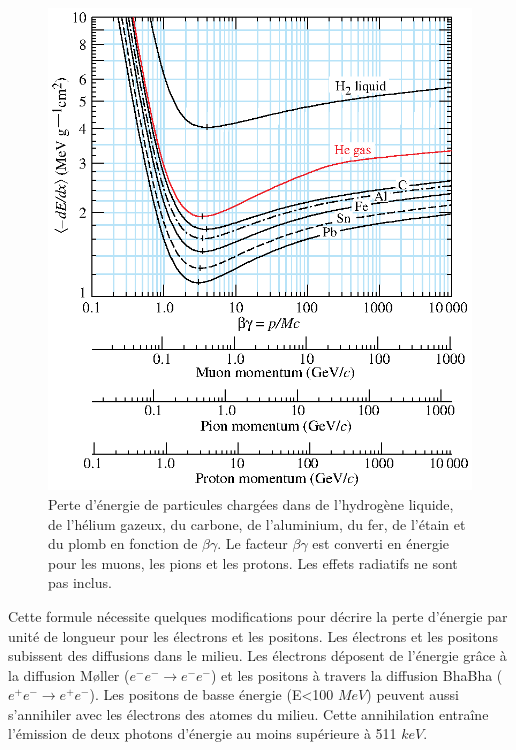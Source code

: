 \begin{figure}[!h]
  \begin{center}
    \includegraphics[width=.6\textwidth]{ShowerTh/figs/dedx_table_98.eps}
    \caption{Perte d'énergie de particules chargées dans de l'hydrogène liquide, de l'hélium gazeux, du carbone, de l'aluminium, du fer, de l'étain et du plomb en fonction de $\beta\gamma$. Le facteur $\beta\gamma$ est converti en énergie pour les muons, les pions et les protons. Les effets radiatifs ne sont pas inclus.}
    \label{fig:charged_in_matter}
  \end{center}
\end{figure}

Cette formule nécessite quelques modifications pour décrire la perte d'énergie par unité de longueur pour les électrons et les positons. Les électrons et les positons subissent des diffusions dans le milieu. Les électrons déposent de l'énergie grâce à la diffusion M{\o}ller ($e^-e^-\rightarrow e^-e^-$) et les positons à travers la diffusion BhaBha ($e^+e^-\rightarrow e^+e^-$). Les positons de basse énergie (E<100 $MeV$) peuvent aussi s'annihiler avec les électrons des atomes du milieu. Cette annihilation entraîne l'émission de deux photons d'énergie au moins supérieure à 511 $keV$.


